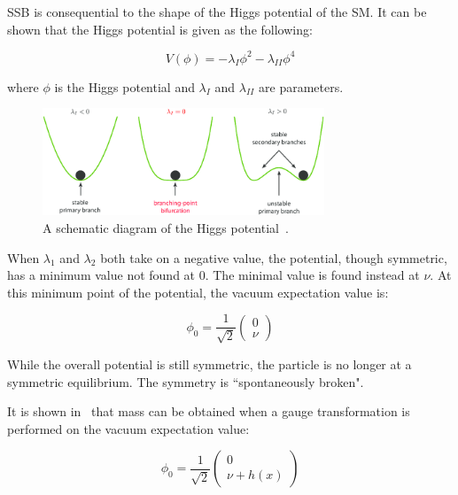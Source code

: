 SSB is consequential to the shape of the Higgs potential of the SM. It can be shown that the Higgs potential is given as the following:

\begin{equation}
    V(\phi) = - \lambda_{I}\phi^{2} - \lambda_{II} \phi^{4}
    \label{eq:HiggsPotential}
\end{equation}

where $\phi$ is the Higgs potential and $\lambda_{I}$ and $\lambda_{II}$ are parameters. 

\begin{figure}[!htb]
    \begin{center}
        \includegraphics[width=0.75\textwidth]{figures/chapter_SM/SSB}
        \caption{
        A schematic diagram of the Higgs potential~\cite{Potential}.}
        \label{fig:SSB}
    \end{center}
\end{figure}

When $\lambda_{1}$ and $\lambda_2$ both take on a negative value, the potential, though symmetric, has a minimum value not found at 0. The minimal value is found instead at $\nu$. At this minimum point of the potential, the vacuum expectation value is:

\begin{equation}
    \phi_{0} = \frac{1}{\sqrt{2}}
    \begin{pmatrix}
        0\\
        \nu
    \end{pmatrix}
\end{equation}

While the overall potential is still symmetric, the particle is no longer at a symmetric equilibrium. The symmetry is ``spontaneously broken". 

It is shown in~\cite{peskin2018introduction} that mass can be obtained when a gauge transformation is performed on the vacuum expectation value:

\begin{equation}
    \phi_{0} = \frac{1}{\sqrt{2}}
    \begin{pmatrix}
        0\\
        \nu+h(x)
    \end{pmatrix}
\end{equation}

